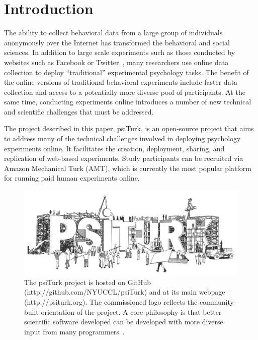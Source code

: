 \documentclass[twocolumn]{svjour3}          %
\newcommand{\psiturk}[0]{\textsf{psiTurk}}
\begin{document}

\section{Introduction}


The ability to collect behavioral data from a large group of individuals
anonymously over the Internet has transformed the behavioral and social
sciences.  In addition to large scale experiments such as those
conducted by websites such as Facebook or 
Twitter~\citep[e.g.,][]{Chen:2013pb,Kramer:2014dq,Wu:2011sp}, many researchers
use online data collection to deploy ``traditional'' experimental psychology
tasks.  The benefit of the online versions of traditional behavioral experiments include 
faster data collection and access to a potentially more diverse pool of participants. 
At the same time, conducting experiments online introduces a number of new 
technical and scientific challenges that must be addressed.

The project described in this paper, \psiturk{}, is an open-source project that aims to address many of the technical challenges
involved in deploying psychology experiments online.
It facilitates the creation, deployment, sharing, and replication of web-based experiments.
Study participants can be recruited via Amazon 
Mechanical Turk (AMT), which is currently the most popular platform for running 
paid human experiments online.

\begin{figure}[tp]
\centering
\includegraphics[scale=.30]{figures/psiturk_logo.jpg}
\caption{The \psiturk{} project is hosted on GitHub 
(\textsf{http://github.com/NYUCCL/psiTurk}) and at its main webpage (\textsf{http://psiturk.org}). 
The commissioned logo reflects the community-built orientation of the project.  A 
core philosophy is that better scientific software developed can be developed 
with more diverse input from many programmers~\citep{Raymond:1999zt}.}
\label{fig:logo}
\end{figure}
\end{document}
